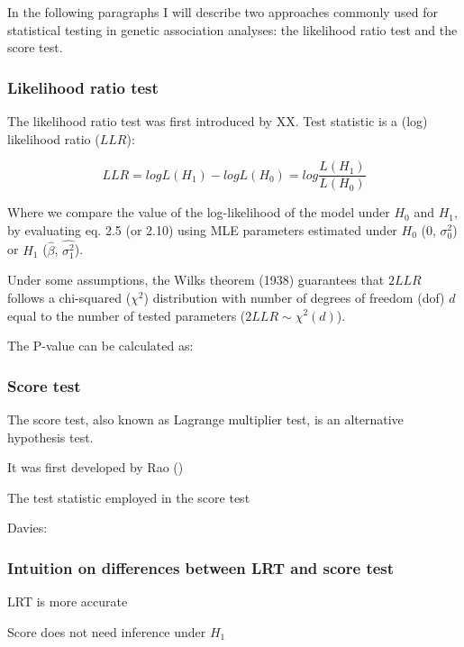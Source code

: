 
\vspace{5mm}

In the following paragraphs I will describe two approaches commonly used for statistical testing in genetic association analyses: the likelihood ratio test and the score test.

\subsubsection{Likelihood ratio test}

The likelihood ratio test was first introduced by XX. 
Test statistic is a (log) likelihood ratio ($LLR$):

\begin{equation}\label{eq18:log_likelihood_ratio}
LLR = logL(H_1) - logL(H_0) = log \frac{L(H_1)}{L(H_0)}
\end{equation}

Where we compare the value of the log-likelihood of the model under $H_0$ and $H_1$, by evaluating eq. 2.5 (or 2.10) using MLE parameters estimated under $H_0$ (0, $\sigma_0^2$) or $H_1$ ($\hat{\beta}$, $\hat{\sigma_1^2}$).  

Under some assumptions, the Wilks theorem (1938) guarantees that $2LLR$ follows a chi-squared ($\chi^2$) distribution with number of degrees of freedom (dof) $d$ equal to the number of tested parameters ($2LLR \sim \chi^2(d)$).

The P-value can be calculated as:

\subsubsection{Score test}

The score test, also known as Lagrange multiplier test, is an alternative hypothesis test.

It was first developed by Rao (\cite{rao1948large})

The test statistic employed in the score test 

Davies:

\subsubsection{Intuition on differences between LRT and score test}

LRT is more accurate 

Score does not need inference under $H_1$

